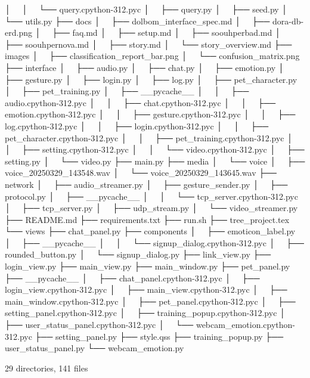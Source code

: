 │   │   └── query.cpython-312.pyc
│   ├── query.py
│   ├── seed.py
│   └── utils.py
├── docs
│   ├── dolbom_interface_spec.md
│   ├── dora-db-erd.png
│   ├── faq.md
│   ├── setup.md
│   ├── soouhperbad.md
│   ├── soouhpernova.md
│   ├── story.md
│   └── story_overview.md
├── images
│   ├── classification_report_bar.png
│   └── confusion_matrix.png
├── interface
│   ├── audio.py
│   ├── chat.py
│   ├── emotion.py
│   ├── gesture.py
│   ├── login.py
│   ├── log.py
│   ├── pet_character.py
│   ├── pet_training.py
│   ├── __pycache__
│   │   ├── audio.cpython-312.pyc
│   │   ├── chat.cpython-312.pyc
│   │   ├── emotion.cpython-312.pyc
│   │   ├── gesture.cpython-312.pyc
│   │   ├── log.cpython-312.pyc
│   │   ├── login.cpython-312.pyc
│   │   ├── pet_character.cpython-312.pyc
│   │   ├── pet_training.cpython-312.pyc
│   │   ├── setting.cpython-312.pyc
│   │   └── video.cpython-312.pyc
│   ├── setting.py
│   └── video.py
├── main.py
├── media
│   └── voice
│       ├── voice_20250329_143548.wav
│       └── voice_20250329_143645.wav
├── network
│   ├── audio_streamer.py
│   ├── gesture_sender.py
│   ├── protocol.py
│   ├── __pycache__
│   │   └── tcp_server.cpython-312.pyc
│   ├── tcp_server.py
│   ├── udp_stream.py
│   └── video_streamer.py
├── README.md
├── requirements.txt
├── run.sh
├── tree_project.tex
└── views
    ├── chat_panel.py
    ├── components
    │   ├── emoticon_label.py
    │   ├── __pycache__
    │   │   └── signup_dialog.cpython-312.pyc
    │   ├── rounded_button.py
    │   └── signup_dialog.py
    ├── link_view.py
    ├── login_view.py
    ├── main_view.py
    ├── main_window.py
    ├── pet_panel.py
    ├── __pycache__
    │   ├── chat_panel.cpython-312.pyc
    │   ├── login_view.cpython-312.pyc
    │   ├── main_view.cpython-312.pyc
    │   ├── main_window.cpython-312.pyc
    │   ├── pet_panel.cpython-312.pyc
    │   ├── setting_panel.cpython-312.pyc
    │   ├── training_popup.cpython-312.pyc
    │   ├── user_status_panel.cpython-312.pyc
    │   └── webcam_emotion.cpython-312.pyc
    ├── setting_panel.py
    ├── style.qss
    ├── training_popup.py
    ├── user_status_panel.py
    └── webcam_emotion.py

29 directories, 141 files
